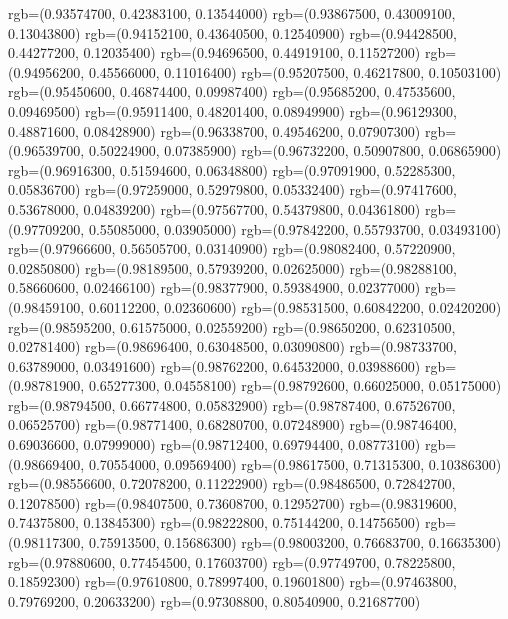 {{        rgb=(0.93574700, 0.42383100, 0.13544000)
        rgb=(0.93867500, 0.43009100, 0.13043800)
        rgb=(0.94152100, 0.43640500, 0.12540900)
        rgb=(0.94428500, 0.44277200, 0.12035400)
        rgb=(0.94696500, 0.44919100, 0.11527200)
        rgb=(0.94956200, 0.45566000, 0.11016400)
        rgb=(0.95207500, 0.46217800, 0.10503100)
        rgb=(0.95450600, 0.46874400, 0.09987400)
        rgb=(0.95685200, 0.47535600, 0.09469500)
        rgb=(0.95911400, 0.48201400, 0.08949900)
        rgb=(0.96129300, 0.48871600, 0.08428900)
        rgb=(0.96338700, 0.49546200, 0.07907300)
        rgb=(0.96539700, 0.50224900, 0.07385900)
        rgb=(0.96732200, 0.50907800, 0.06865900)
        rgb=(0.96916300, 0.51594600, 0.06348800)
        rgb=(0.97091900, 0.52285300, 0.05836700)
        rgb=(0.97259000, 0.52979800, 0.05332400)
        rgb=(0.97417600, 0.53678000, 0.04839200)
        rgb=(0.97567700, 0.54379800, 0.04361800)
        rgb=(0.97709200, 0.55085000, 0.03905000)
        rgb=(0.97842200, 0.55793700, 0.03493100)
        rgb=(0.97966600, 0.56505700, 0.03140900)
        rgb=(0.98082400, 0.57220900, 0.02850800)
        rgb=(0.98189500, 0.57939200, 0.02625000)
        rgb=(0.98288100, 0.58660600, 0.02466100)
        rgb=(0.98377900, 0.59384900, 0.02377000)
        rgb=(0.98459100, 0.60112200, 0.02360600)
        rgb=(0.98531500, 0.60842200, 0.02420200)
        rgb=(0.98595200, 0.61575000, 0.02559200)
        rgb=(0.98650200, 0.62310500, 0.02781400)
        rgb=(0.98696400, 0.63048500, 0.03090800)
        rgb=(0.98733700, 0.63789000, 0.03491600)
        rgb=(0.98762200, 0.64532000, 0.03988600)
        rgb=(0.98781900, 0.65277300, 0.04558100)
        rgb=(0.98792600, 0.66025000, 0.05175000)
        rgb=(0.98794500, 0.66774800, 0.05832900)
        rgb=(0.98787400, 0.67526700, 0.06525700)
        rgb=(0.98771400, 0.68280700, 0.07248900)
        rgb=(0.98746400, 0.69036600, 0.07999000)
        rgb=(0.98712400, 0.69794400, 0.08773100)
        rgb=(0.98669400, 0.70554000, 0.09569400)
        rgb=(0.98617500, 0.71315300, 0.10386300)
        rgb=(0.98556600, 0.72078200, 0.11222900)
        rgb=(0.98486500, 0.72842700, 0.12078500)
        rgb=(0.98407500, 0.73608700, 0.12952700)
        rgb=(0.98319600, 0.74375800, 0.13845300)
        rgb=(0.98222800, 0.75144200, 0.14756500)
        rgb=(0.98117300, 0.75913500, 0.15686300)
        rgb=(0.98003200, 0.76683700, 0.16635300)
        rgb=(0.97880600, 0.77454500, 0.17603700)
        rgb=(0.97749700, 0.78225800, 0.18592300)
        rgb=(0.97610800, 0.78997400, 0.19601800)
        rgb=(0.97463800, 0.79769200, 0.20633200)
        rgb=(0.97308800, 0.80540900, 0.21687700)
}}
